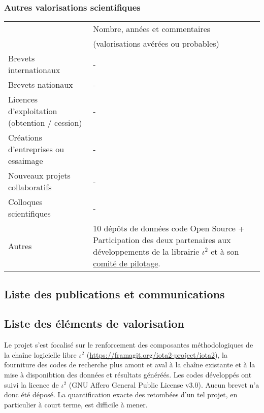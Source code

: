 \subsubsection*{Autres valorisations scientifiques} 
\begin{table}[htbp]
\small
    \centering
    \begin{tabular}{|p{6.8cm}|p{6.7cm}|}
    \hline
& Nombre, années et commentaires \\
&(valorisations avérées ou probables)\\\hline
Brevets internationaux &-\\\hline
Brevets nationaux &- \\\hline
Licences d’exploitation (obtention / cession)&- \\\hline
Créations d’entreprises ou essaimage&- \\\hline
Nouveaux projets collaboratifs & - \\\hline
Colloques scientifiques&- \\\hline
Autres & 10 dépôts de données code Open Source + Participation des deux partenaires aux développements de la librairie $\iota^2$ et à son \href{https://framagit.org/iota2-project/iota2/-/wikis/Project-Steering-Committee}{comité de pilotage}. \\
\hline
    \end{tabular}
    \label{tab:valo_other}
\end{table}


\subsection{Liste des publications et communications}

\printbibliography[keyword={LASTIG-CESBIO-j},title={Journaux}]
\printbibliography[keyword={LASTIG-CESBIO-c},title={Conférences}]

\subsection{Liste des éléments de valorisation}
\label{subsec:valo}
Le projet s'est focalisé sur le renforcement des composantes méthodologiques de la chaîne logicielle libre $\iota^2$ (\href{https://framagit.org/iota2-project/iota2}{https://framagit.org/iota2-project/iota2}), la fourniture des codes de recherche plus amont et aval à la chaîne existante et à la mise à disponibtion des données et résultats généréés. Les codes développés ont suivi la licence de $\iota^2$ (GNU Affero General Public License v3.0). Aucun brevet n'a donc été déposé. La quantification exacte des retombées d'un tel projet, en particulier à court terme, est difficile à mener.

